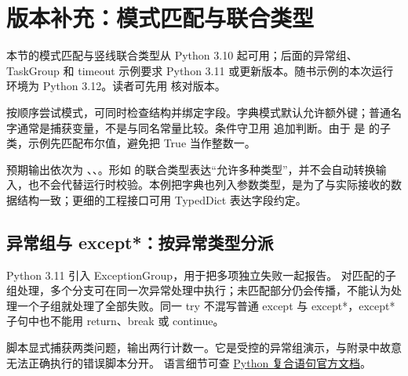\section{版本补充：模式匹配与联合类型}\label{rev:python:language}
本节的模式匹配与竖线联合类型从 Python 3.10 起可用；后面的异常组、TaskGroup 和 timeout 示例要求 Python 3.11 或更新版本。随书示例的本次运行环境为 Python 3.12。读者可先用  核对版本。

 按顺序尝试模式，可同时检查结构并绑定字段。字典模式默认允许额外键；普通名字通常是捕获变量，不是与同名常量比较。条件守卫用  追加判断。由于  是  的子类，示例先匹配布尔值，避免把 True 当作整数一。

预期输出依次为 、、。形如  的联合类型表达“允许多种类型”，并不会自动转换输入，也不会代替运行时校验。本例把字典也列入参数类型，是为了与实际接收的数据结构一致；更细的工程接口可用 TypedDict 表达字段约定。

\subsection{异常组与 except*：按异常类型分派}
Python 3.11 引入 ExceptionGroup，用于把多项独立失败一起报告。 对匹配的子组处理，多个分支可在同一次异常处理中执行；未匹配部分仍会传播，不能认为处理一个子组就处理了全部失败。同一 try 不混写普通 except 与 except*，except* 子句中也不能用 return、break 或 continue。

脚本显式捕获两类问题，输出两行计数一。它是受控的异常组演示，与附录中故意无法正确执行的错误脚本分开。
语言细节可查 \href{https://docs.python.org/3/reference/compound_stmts.html}{Python 复合语句官方文档}。
